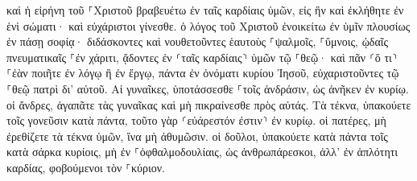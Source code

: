 \documentclass{openreader}
\begin{document}
καὶ ἡ εἰρήνη τοῦ ⸀Χριστοῦ βραβευέτω ἐν ταῖς καρδίαις ὑμῶν, εἰς ἣν καὶ ἐκλήθητε ἐν ἑνὶ σώματι· καὶ εὐχάριστοι γίνεσθε. 
ὁ λόγος τοῦ Χριστοῦ ἐνοικείτω ἐν ὑμῖν πλουσίως ἐν πάσῃ σοφίᾳ· διδάσκοντες καὶ νουθετοῦντες ἑαυτοὺς ⸀ψαλμοῖς, ⸀ὕμνοις, ᾠδαῖς πνευματικαῖς ⸀ἐν χάριτι, ᾄδοντες ἐν ⸂ταῖς καρδίαις⸃ ὑμῶν τῷ ⸀θεῷ· 
καὶ πᾶν ⸂ὅ τι⸃ ⸀ἐὰν ποιῆτε ἐν λόγῳ ἢ ἐν ἔργῳ, πάντα ἐν ὀνόματι κυρίου Ἰησοῦ, εὐχαριστοῦντες τῷ ⸀θεῷ πατρὶ δι’ αὐτοῦ. 
Αἱ γυναῖκες, ὑποτάσσεσθε ⸀τοῖς ἀνδράσιν, ὡς ἀνῆκεν ἐν κυρίῳ. 
οἱ ἄνδρες, ἀγαπᾶτε τὰς γυναῖκας καὶ μὴ πικραίνεσθε πρὸς αὐτάς. 
Τὰ τέκνα, ὑπακούετε τοῖς γονεῦσιν κατὰ πάντα, τοῦτο γὰρ ⸂εὐάρεστόν ἐστιν⸃ ἐν κυρίῳ. 
οἱ πατέρες, μὴ ἐρεθίζετε τὰ τέκνα ὑμῶν, ἵνα μὴ ἀθυμῶσιν. 
οἱ δοῦλοι, ὑπακούετε κατὰ πάντα τοῖς κατὰ σάρκα κυρίοις, μὴ ἐν ⸀ὀφθαλμοδουλίαις, ὡς ἀνθρωπάρεσκοι, ἀλλ’ ἐν ἁπλότητι καρδίας, φοβούμενοι τὸν ⸀κύριον. 
\end{document}
